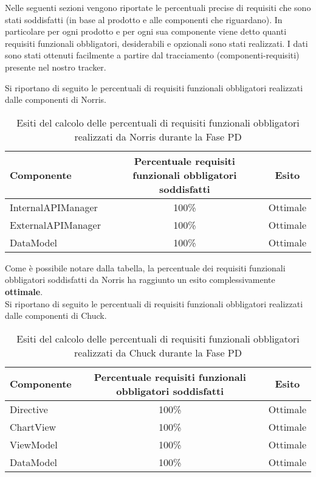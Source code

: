 

















				Nelle seguenti sezioni vengono riportate le percentuali precise di requisiti che sono stati soddisfatti (in base al prodotto e alle componenti che riguardano). In particolare per ogni prodotto e per ogni sua componente viene detto quanti requisiti funzionali obbligatori, desiderabili e opzionali sono stati realizzati. I dati sono stati ottenuti facilmente a partire dal tracciamento (componenti-requisiti) presente nel nostro tracker.

					Si riportano di seguito le percentuali di requisiti funzionali obbligatori realizzati dalle componenti di Norris.
					\begin{table}[H]
						\centering
							\begin{tabu}{| l | c | c |}
								\hline
								Componente	& Percentuale requisiti funzionali obbligatori soddisfatti	& Esito		\\ \hline \hline
								InternalAPIManager	& 100\% 	& Ottimale  \\ \hline
								ExternalAPIManager  & 	100\%	& Ottimale  \\ \hline
								DataModel  & 	100\%	& Ottimale  \\ \hline
							\end{tabu}
						\caption{Esiti del calcolo delle percentuali di requisiti funzionali obbligatori realizzati da Norris durante la Fase PD}
					\end{table}
					Come è possibile notare dalla tabella, la percentuale dei requisiti funzionali obbligatori soddisfatti da Norris ha raggiunto un esito complessivamente \textbf{ottimale}.\\
					Si riportano di seguito le percentuali di requisiti funzionali obbligatori realizzati dalle componenti di Chuck.
					\begin{table}[H]
						\centering
							\begin{tabu}{| l | c | c |}
								\hline
								Componente	& Percentuale requisiti funzionali obbligatori soddisfatti	& Esito		\\ \hline \hline
								Directive  &	100\% 	& Ottimale  \\ \hline
								ChartView  & 	100\%	& Ottimale  \\ \hline
								ViewModel  & 	100\%	& Ottimale  \\ \hline
								DataModel  & 	100\%	& Ottimale  \\ \hline
							\end{tabu}
						\caption{Esiti del calcolo delle percentuali di requisiti funzionali obbligatori realizzati da Chuck durante la Fase PD}
					\end{table}
